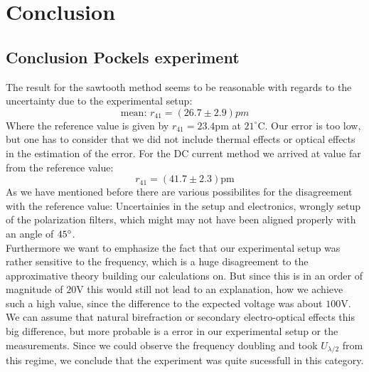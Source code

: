 \section{Conclusion}
\subsection{Conclusion Pockels experiment}
The result for the sawtooth method seems to be reasonable with regards to the uncertainty
due to the experimental setup:
\begin{equation}
    \text{mean: } r_{41}= (26.7 \pm 2.9) pm
\end{equation}
Where the reference value is given by $r_{41} = 23.4$pm at $21^{\circ}$C. Our error is too low,
but one has to consider that we did not include thermal effects or optical effects in the 
estimation of the error.
For the DC current method we arrived at value far from the reference value:
\begin{equation}
    r_{41} = (41.7 \pm 2.3) \textrm{pm} 
\end{equation}
As we have mentioned before there are various possibilites for the disagreement with
the reference value: Uncertainies in the setup and electronics,
wrongly setup of the polarization filters, 
which might may not have been aligned properly with an 
angle of $45^\circ$.  \\
Furthermore we want to emphasize the fact that our experimental setup
was rather sensitive to the frequency, which is a huge disagreement to the
approximative theory building our calculations on. But since this is in
an order of magnitude of $20$V this would still not lead to an explanation,
how we achieve such a high value, since the difference to the expected 
voltage was about $100$V. We can assume that natural birefraction or 
secondary electro-optical effects this big difference, but more probable is 
a error in our experimental setup or the measurements. Since we could observe
the frequency doubling and took $U_{\lambda/2}$ from this regime, we 
conclude that the experiment was quite sucessfull in this category.



